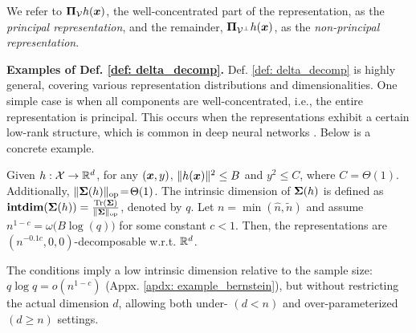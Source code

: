 We refer to ${\bm{\Pi}}_{{\mathcal{V}}}h({\bm{x}})$, the well-concentrated part of the representation, as the \emph{principal representation}, and the remainder, ${\bm{\Pi}}_{{\mathcal{V}}^\perp}h({\bm{x}})$, as the \emph{non-principal representation}.

{\textbf{Examples of Def. \ref{def: delta_decomp}.} Def. \ref{def: delta_decomp} is highly general, covering various representation distributions and dimensionalities. One simple case is when all components are well-concentrated, i.e., the entire representation is principal. This occurs when the representations exhibit a certain low-rank structure, which is common in deep neural networks \cite{huh2021low}.  Below is a concrete example. }
\begin{example}\label{eg: intrinsic_bounded} Given $h: {\mathcal{X}}\rightarrow {\mathbb{R}}^d $, for any $({\bm{x}}, y)$, $\| h({\bm{x}}) \|^2 \leq B$ and $y^2 \leq C$, where $C\!=\! \Theta(1)$. Additionally, $\lVert {\bm{\Sigma}}(h) \rVert_{\mathrm{op}} \!=\! \Theta(1)$. The intrinsic dimension of ${\bm{\Sigma}}(h)$ is defined as $\textbf{intdim}({\bm{\Sigma}}(h)) = \frac{\operatorname{Tr}({\bm{\Sigma}})}{\lVert {\bm{\Sigma}} \rVert_{\mathrm{op}}}$, denoted by $q$. Let $n\!=\! \min(\hat{n}, \tilde{n})$ and assume $n^{1-c} = \omega\big(B \log(q)\big)$ for some constant $c < 1$. Then, the representations are $(n^{-0.1c}, 0, 0)$-decomposable w.r.t. ${\mathbb{R}}^d$.
\end{example}
\begin{remark}
The conditions imply a low intrinsic dimension relative to the sample size: $q \log q \!=\! o(n^{1-c})$ (Appx. \ref{apdx: example_bernstein}), but without restricting the actual dimension $d$, allowing both under- $(d\!<\!n)$ and over-parameterized $(d\!\geq\! n)$ settings. 
\end{remark}

